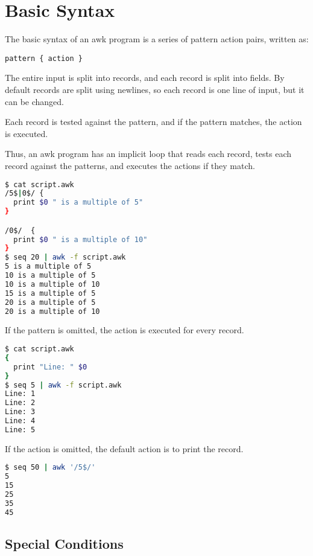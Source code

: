 \section{Basic Syntax}

The basic syntax of an awk program is a series of pattern action pairs, written as:

\begin{lstlisting}
pattern { action }
\end{lstlisting}

The entire input is split into records, and each record is split into fields. By default records are split using newlines, so each record is one line of input, but it can be changed.

Each record is tested against the pattern, and if the pattern matches, the action is executed.

Thus, an awk program has an implicit loop that reads each record, tests each record against the patterns, and executes the actions if they match.

\begin{lstlisting}[language=bash]
$ cat script.awk
/5$|0$/ {
  print $0 " is a multiple of 5"
}

/0$/  {
  print $0 " is a multiple of 10"
}
$ seq 20 | awk -f script.awk
5 is a multiple of 5
10 is a multiple of 5
10 is a multiple of 10
15 is a multiple of 5
20 is a multiple of 5
20 is a multiple of 10
\end{lstlisting}

If the pattern is omitted, the action is executed for every record.

\begin{lstlisting}[language=bash]
$ cat script.awk
{
  print "Line: " $0
}
$ seq 5 | awk -f script.awk
Line: 1
Line: 2
Line: 3
Line: 4
Line: 5
\end{lstlisting}

If the action is omitted, the default action is to print the record.

\begin{lstlisting}[language=bash]
$ seq 50 | awk '/5$/'
5
15
25
35
45
\end{lstlisting}

\subsection{Special Conditions}

